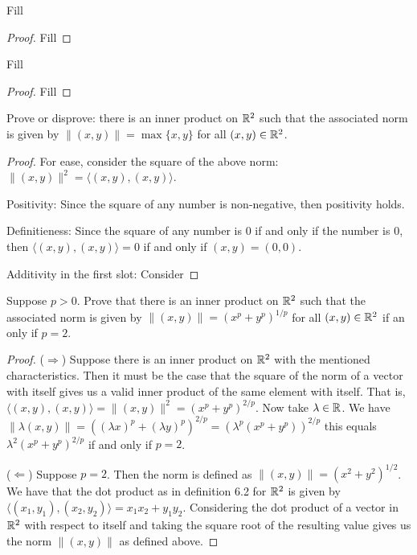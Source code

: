 \begin{exercise}{13}
  Fill
\end{exercise}
\begin{proof}
 Fill
\end{proof}

\begin{exercise}{14}
  Fill
\end{exercise}
\begin{proof}
 Fill
\end{proof}

\begin{exercise}{17}
  Prove or disprove: there is an inner product on $\mathbb{R}^2$ such that the associated norm is given by $\lVert (x,y)\rVert=\max\{x,y\}$ for all $(x,y)\in\mathbb{R}^2$.
\end{exercise}
\begin{proof}
 For ease, consider the square of the above norm: $\lVert (x,y)\rVert^2=\langle (x,y),(x,y)\rangle$.

 Positivity: Since the square of any number is non-negative, then positivity holds. 

 Definitieness: Since the square of any number is 0 if and only if the number is 0, then $\langle (x,y),(x,y)\rangle=0$ if and only if $(x,y)=(0,0)$.

 Additivity in the first slot: Consider 
\end{proof}

\begin{exercise}{18}
  Suppose $p>0$. Prove that there is an inner product on $\mathbb{R}^2$ such that the associated norm is given by $\lVert (x,y)\rVert =(x^p+y^p)^{1/p}$ for all $(x,y)\in\mathbb{R}^2$ if an only if $p=2$.
\end{exercise}
\begin{proof}
 ($\Rightarrow$) Suppose there is an inner product on $\mathbb{R}^2$ with the mentioned characteristics. Then it must be the case that the square  of the norm of a vector with itself gives us a valid inner product of the same element with itself. That is, $\langle (x,y), (x,y)\rangle=\lVert (x,y)\rVert^2= (x^p+y^p)^{2/p}$. Now take $\lambda\in\mathbb{R}$. We have $\lVert\lambda(x,y)\rVert= ((\lambda x)^p+(\lambda y)^p)^{2/p}=(\lambda^p(x^p+y^p))^{2/p}$ this equals $\lambda^2(x^p+y^p)^{2/p}$ if and only if $p=2$.

 ($\Leftarrow$) Suppose $p=2$. Then the norm is defined as $\lVert (x,y)\rVert =(x^2+y^2)^{1/2}$. We have that the dot product as in definition 6.2 for $\mathbb{R}^2$ is given by $\langle (x_1,y_1), (x_2,y_2)\rangle= x_1x_2+y_1y_2$. Considering the dot product of a vector in $\mathbb{R}^2$ with respect to itself and taking the square root of the resulting value gives us the norm $\lVert (x,y)\rVert$ as defined above.
\end{proof}

